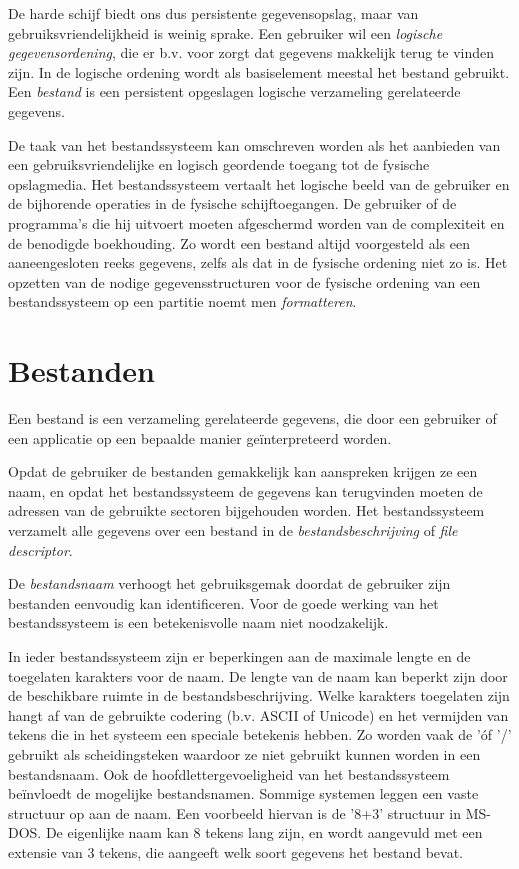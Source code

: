 De harde schijf biedt ons dus persistente gegevensopslag, maar
van gebruiksvriendelijkheid is weinig sprake. Een gebruiker wil een
\emph{logische gegevensordening}, die er b.v. voor zorgt
dat gegevens makkelijk terug te vinden zijn. In de logische ordening
wordt als basiselement meestal het bestand gebruikt. Een
\emph{bestand} is een persistent opgeslagen logische
verzameling gerelateerde gegevens.

De taak van het bestandssysteem kan omschreven worden als het
aanbieden van een gebruiksvriendelijke en logisch geordende toegang
tot de fysische opslagmedia. Het bestandssysteem vertaalt het logische
beeld van de gebruiker en de bijhorende operaties in de fysische
schijftoegangen. De gebruiker of de programma's die hij uitvoert
moeten afgeschermd worden van de complexiteit en de benodigde
boekhouding. Zo wordt een bestand altijd voorgesteld als een
aaneengesloten reeks gegevens, zelfs als dat in de fysische ordening
niet zo is. Het opzetten van de nodige gegevensstructuren voor de
fysische ordening van een bestandssysteem op een partitie noemt men
\emph{formatteren}.

\section{Bestanden}

Een bestand is een verzameling gerelateerde gegevens, die door een
gebruiker of een applicatie op een bepaalde manier ge\"interpreteerd
worden.

Opdat de gebruiker de bestanden gemakkelijk kan aanspreken krijgen
ze een naam, en opdat het bestandssysteem de gegevens kan terugvinden
moeten de adressen van de gebruikte sectoren bijgehouden worden. Het
bestandssysteem verzamelt alle gegevens over een bestand in de
\emph{bestandsbeschrijving} of \emph{file
descriptor}.

De \emph{bestandsnaam} verhoogt het gebruiksgemak
doordat de gebruiker zijn bestanden eenvoudig kan identificeren. Voor de
goede werking van het bestandssysteem is een betekenisvolle naam niet
noodzakelijk.

In ieder bestandssysteem zijn er beperkingen aan de maximale
lengte en de toegelaten karakters voor de naam. De lengte van de naam
kan beperkt zijn door de beschikbare ruimte in de bestandsbeschrijving.
Welke karakters toegelaten zijn hangt af van de gebruikte codering (b.v.
ASCII of Unicode) en het vermijden van tekens die in het systeem een
speciale betekenis hebben. Zo worden vaak de '\' of '/' gebruikt als
scheidingsteken waardoor ze niet gebruikt kunnen worden in een
bestandsnaam. Ook de hoofdlettergevoeligheid van het bestandssysteem
be\"invloedt de mogelijke bestandsnamen. Sommige systemen leggen een vaste
structuur op aan de naam. Een voorbeeld hiervan is de '8+3' structuur in
MS-DOS. De eigenlijke naam kan 8 tekens lang zijn, en wordt aangevuld
met een extensie van 3 tekens, die aangeeft welk soort gegevens het
bestand bevat.

